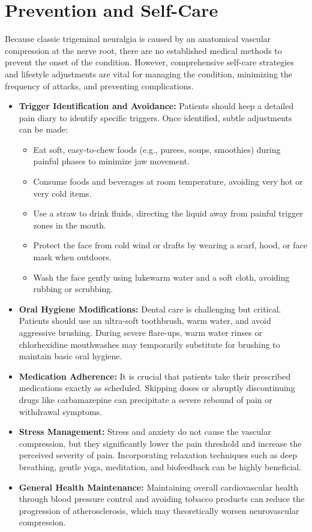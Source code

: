 \section*{Prevention and Self-Care}
Because classic trigeminal neuralgia is caused by an anatomical vascular compression at the nerve root, there are no established medical methods to prevent the onset of the condition. However, comprehensive self-care strategies and lifestyle adjustments are vital for managing the condition, minimizing the frequency of attacks, and preventing complications.
\begin{itemize}
  \item \textbf{Trigger Identification and Avoidance:} Patients should keep a detailed pain diary to identify specific triggers. Once identified, subtle adjustments can be made:
  \begin{itemize}
    \item Eat soft, easy-to-chew foods (e.g., purees, soups, smoothies) during painful phases to minimize jaw movement.
    \item Consume foods and beverages at room temperature, avoiding very hot or very cold items.
    \item Use a straw to drink fluids, directing the liquid away from painful trigger zones in the mouth.
    \item Protect the face from cold wind or drafts by wearing a scarf, hood, or face mask when outdoors.
    \item Wash the face gently using lukewarm water and a soft cloth, avoiding rubbing or scrubbing.
  \end{itemize}
  \item \textbf{Oral Hygiene Modifications:} Dental care is challenging but critical. Patients should use an ultra-soft toothbrush, warm water, and avoid aggressive brushing. During severe flare-ups, warm water rinses or chlorhexidine mouthwashes may temporarily substitute for brushing to maintain basic oral hygiene.
  \item \textbf{Medication Adherence:} It is crucial that patients take their prescribed medications exactly as scheduled. Skipping doses or abruptly discontinuing drugs like carbamazepine can precipitate a severe rebound of pain or withdrawal symptoms.
  \item \textbf{Stress Management:} Stress and anxiety do not cause the vascular compression, but they significantly lower the pain threshold and increase the perceived severity of pain. Incorporating relaxation techniques such as deep breathing, gentle yoga, meditation, and biofeedback can be highly beneficial.
  \item \textbf{General Health Maintenance:} Maintaining overall cardiovascular health through blood pressure control and avoiding tobacco products can reduce the progression of atherosclerosis, which may theoretically worsen neurovascular compression.
\end{itemize}

